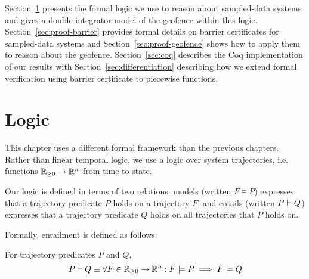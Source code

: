 Section~\ref{sec:model} presents the formal logic we use to reason about
sampled-data systems and gives a double integrator model of the geofence
within this logic. Section~\ref{sec:proof-barrier} provides formal details
on barrier certificates for sampled-data systems and
Section~\ref{sec:proof-geofence} shows how to apply them to reason about
the geofence. Section~\ref{sec:coq} describes the Coq implementation of our
results with Section~\ref{sec:differentiation} describing how we extend
formal verification using barrier certificate to piecewise functions.

\section{Logic}
\label{sec:model}
This chapter uses a different formal framework than the previous
chapters. Rather than linear temporal logic, we use a logic over system
trajectories, i.e. functions $\mathbb{R}_{\geq 0} \rightarrow \mathbb{R}^n$ from time to state.

Our logic is defined in terms of two relations: models (written $F \models
P$) expresses that a trajectory predicate $P$ holds on a trajectory $F$;
and entails (written $P \vdash Q$) expresses that a trajectory predicate
$Q$ holds on all trajectories that $P$ holds on.

Formally, entailment is defined as follows:
\begin{definition}[Entailment]
For trajectory predicates $P$ and $Q$,
\[
P \vdash Q \equiv \forall F \in \mathbb{R}_{\geq 0} \rightarrow \mathbb{R}^n : F \models P \implies F \models Q
\]
\label{def:entailment}
\end{definition}

